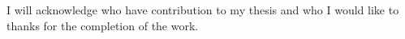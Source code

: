 I will acknowledge who have contribution to my thesis and who I would like to thanks for the completion of the work.
